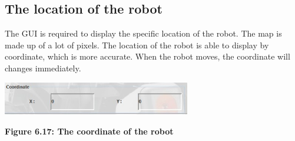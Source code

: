 \documentclass[11pt, a4paper]{report}
\begin{document}
\subsection{The location of the robot}
The GUI is required to display the specific location of the robot. The map is made up of a lot of pixels. The location of the robot is able to display by coordinate, which is more accurate. When the robot moves, the coordinate will changes immediately.
   \begin{center}
 \includegraphics[width=8.20cm]{RobotCoordinate.jpg}
\end{center}
\begin{center}
\textbf {Figure 6.17: The coordinate of the robot} \\[0.3cm]
\end{center}
\end{document}

